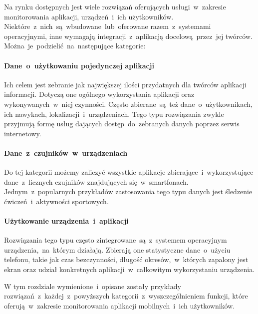Na rynku dostępnych jest wiele rozwiązań oferujących usługi~w~zakresie monitorowania aplikacji, urządzeń~i~ich użytkowników. Niektóre~z~nich~są~wbudowane~lub~oferowane razem~z~systemami operacyjnymi, inne wymagają integracji~z~aplikacją docelową~przez~jej twórców. Można~je~podzielić~na~następujące kategorie:

\paragraph{Dane~o~użytkowaniu pojedynczej aplikacji} 
Ich celem jest zebranie jak największej ilości przydatnych dla twórców aplikacji informacji. Dotyczą one ogólnego wykorzystania aplikacji oraz wykonywanych~w~niej czynności. Często zbierane~są~też dane~o~użytkownikach, ich nawykach, lokalizacji~i~urządzeniach. Tego typu rozwiązania zwykle przyjmują formę usług dających dostęp~do~zebranych danych poprzez serwis internetowy. 

\paragraph{Dane~z~czujników~w~urządzeniach} 
Do tej kategorii możemy zaliczyć wszystkie aplikacje zbierające~i~wykorzystujące dane~z~licznych czujników znajdujących się~w~smartfonach. Jednym~z~popularnych przykładów zastosowania tego typu danych jest śledzenie ćwiczeń~i~aktywności sportowych.

\paragraph{Użytkowanie urządzenia~i~aplikacji} 
Rozwiązania tego typu często zintegrowane~są~z~systemem operacyjnym urządzenia,~na~którym działają. Zbierają one statystyczne dane~o~użyciu telefonu, takie jak czas bezczynności, długość okresów,~w~których zapalony jest ekran oraz udział konkretnych aplikacji~w~całkowitym wykorzystaniu urządzenia.
\bigskip

W tym rozdziale wymienione~i~opisane zostały przykłady rozwiązań~z~każdej~z~powyższych kategorii~z~wyszczególnieniem funkcji, które oferują~w~zakresie monitorowania aplikacji mobilnych~i~ich użytkowników.
